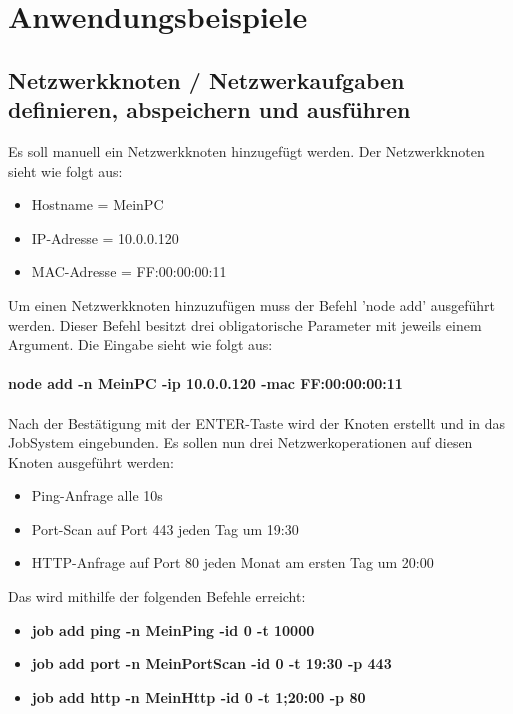 \documentclass[12pt,a4paper]{report}
\begin{document}
\section{Anwendungsbeispiele}

\subsection{Netzwerkknoten / Netzwerkaufgaben definieren, abspeichern und ausführen}

Es soll manuell ein Netzwerkknoten hinzugefügt werden. Der Netzwerkknoten sieht wie folgt aus:

\begin{itemize}
  \item Hostname = MeinPC
  \item IP-Adresse = 10.0.0.120
  \item MAC-Adresse = FF:00:00:00:11
\end{itemize}

Um einen Netzwerkknoten hinzuzufügen muss der Befehl 'node add' ausgeführt werden. Dieser Befehl besitzt drei obligatorische Parameter mit jeweils einem Argument. Die Eingabe sieht wie folgt aus:\\\\

\textbf{node add -n MeinPC -ip 10.0.0.120 -mac FF:00:00:00:11}\\\\

Nach der Bestätigung mit der ENTER-Taste wird der Knoten erstellt und in das JobSystem eingebunden. Es sollen nun drei Netzwerkoperationen auf diesen Knoten ausgeführt werden:

\begin{itemize}
\item Ping-Anfrage alle 10s
\item Port-Scan auf Port 443 jeden Tag um 19:30
\item HTTP-Anfrage auf Port 80 jeden Monat am ersten Tag um 20:00
\end{itemize}

Das wird mithilfe der folgenden Befehle erreicht:

\begin{itemize}
\item \textbf{job add ping -n MeinPing -id 0 -t 10000}
\item \textbf{job add port -n MeinPortScan -id 0 -t 19:30 -p 443}
\item \textbf{job add http -n MeinHttp -id 0 -t 1;20:00 -p 80}
\end{itemize}
\end{document}
